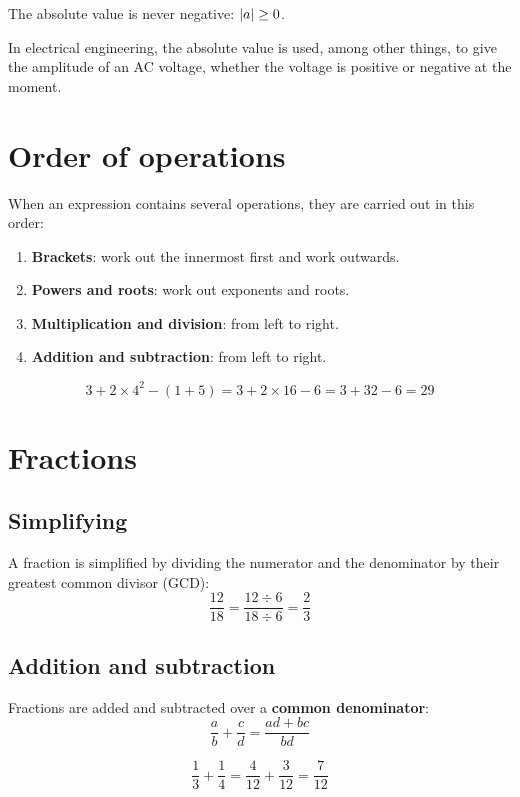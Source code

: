 The absolute value is never negative: $\lvert a\rvert \geq 0$.

In electrical engineering, the absolute value is used, among other things, to give the amplitude
of an AC voltage, whether the voltage is positive or negative at the moment.

\section{Order of operations}
\label{c1:sec:rakneordning}
When an expression contains several operations, they are carried out in this order:
\begin{enumerate}
  \item \textbf{Brackets}: work out the innermost first and work outwards.
  \item \textbf{Powers and roots}: work out exponents and roots.
  \item \textbf{Multiplication and division}: from left to right.
  \item \textbf{Addition and subtraction}: from left to right.
\end{enumerate}

\begin{exempel}
\[
  3 + 2 \times 4^2 - (1 + 5) = 3 + 2 \times 16 - 6 = 3 + 32 - 6 = 29
\]
\end{exempel}

\section{Fractions}
\label{c1:sec:brak}

\subsection{Simplifying}
\label{c1:sec:forenkling}
A fraction is simplified by dividing the numerator and the denominator by their greatest common
divisor (GCD):
\[
  \frac{12}{18} = \frac{12 \div 6}{18 \div 6} = \frac{2}{3}
\]

\subsection{Addition and subtraction}
\label{c1:sec:bradd}
Fractions are added and subtracted over a \textbf{common denominator}:
\[
  \frac{a}{b} + \frac{c}{d} = \frac{ad + bc}{bd}
\]

\begin{exempel}
\[
  \frac{1}{3} + \frac{1}{4} = \frac{4}{12} + \frac{3}{12} = \frac{7}{12}
\]
\end{exempel}

